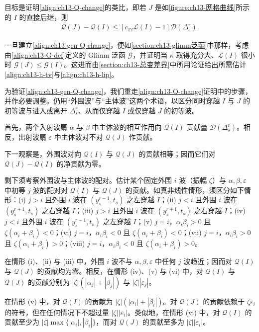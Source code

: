 \documentclass[../../main.tex]{subfiles}
\begin{document}
目标是证明\eqref{align:ch13-Q-change}的类比，即若 $J$ 是如\cref{figure:ch13-网格曲线}所示的 $I$ 的直接后继，则
\begin{align}
\mathscr{Q}(J)-\mathscr{Q}(I)\leqslant[c_{12}\mathscr{L}(I)-1]\mathscr{D}(\Delta_s^r).
\label{align:ch13-gen-Q-change}
\end{align}

一旦建立\eqref{align:ch13-gen-Q-change}，便如\cref{section:ch13-glimm泛函}中那样，考虑由\eqref{align:ch13-G-def}定义的 Glimm 泛函 $\mathscr{G}$，并证明当 $\kappa$ 取得充分大、$\mathscr{L}(I)$ 很小时 $\mathscr{G}(J)\leqslant\mathscr{G}(I)$。这进而由\cref{section:ch13-总变差界}中所用论证给出所需估计\eqref{align:ch13-h-tv}与\eqref{align:ch13-h-lip}。

为验证\eqref{align:ch13-gen-Q-change}，我们重走\eqref{align:ch13-Q-change}证明中的步骤，并作必要调整。仍用``外围波''与``主体波''这两个术语，以区分同时穿越 $I$ 与 $J$ 的初等波与进入或离开 $\Delta_s^r$、从而仅穿越 $I$ 或仅穿越 $J$ 的初等波。

首先，两个入射波扇 $\alpha$ 与 $\beta$ 中主体波的相互作用向 $\mathscr{Q}(I)$ 贡献量 $\mathscr{D}(\Delta_s^r)$。相反，出射波扇 $\varepsilon$ 中主体波对不对 $\mathscr{Q}(J)$ 作贡献。

下一观察是，外围波对向 $\mathscr{Q}(I)$ 与 $\mathscr{Q}(J)$ 的贡献相等；因而它们对 $\mathscr{Q}(J)-\mathscr{Q}(I)$ 的净贡献为零。

剩下须考察外围波与主体波的配对。估计某个固定外围 $i$ 波（振幅 $\zeta$）与 $\alpha,\beta,\varepsilon$ 中初等 $j$ 波的配对对 $\mathscr{Q}(I)$ 与 $\mathscr{Q}(J)$ 的贡献。如真非线性情形，须区分如下情形：(i) $j>i$ 且外围 $i$ 波在 $(y_s^{r-1},t_s)$ 之左穿越 $I$；(ii) $j<i$ 且外围 $i$ 波在 $(y_s^{r+1},t_s)$ 之右穿越 $I$；(iii) $j>i$ 且外围 $i$ 波在 $(y_s^{r+1},t_s)$ 之右穿越 $I$；(iv) $j<i$ 且外围 $i$ 波在 $(y_s^{r-1},t_s)$ 之左穿越 $I$；(v) $j=i$，$\alpha_i\beta_i>0$ 且 $\zeta(\alpha_i+\beta_i)<0$；(vi) $j=i$，$\alpha_i\beta_i<0$ 且 $\zeta(\alpha_i+\beta_i)<0$；(vii) $j=i$，$\alpha_i\beta_i>0$ 且 $\zeta(\alpha_i+\beta_i)>0$；(viii) $j=i$，$\alpha_i\beta_i<0$ 且 $\zeta(\alpha_i+\beta_i)>0$。

在情形 (i)、(ii) 与 (iii) 中，外围 $i$ 波不与 $\alpha,\beta,\varepsilon$ 中任何 $j$ 波趋近；因而对 $\mathscr{Q}(I)$ 与 $\mathscr{Q}(J)$ 的贡献均为零。相反，在情形 (iv)、(v) 与 (vi) 中，对 $\mathscr{Q}(I)$ 与 $\mathscr{Q}(J)$ 的贡献分别为 $|\zeta|(|\alpha_j|+|\beta_j|)$ 与 $|\zeta||\varepsilon_j|$。

在情形 (v) 中，对 $\mathscr{Q}(I)$ 的贡献为 $|\zeta|(|\alpha_i|+|\beta_i|)$。对 $\mathscr{Q}(J)$ 的贡献依赖于 $\zeta\varepsilon_i$ 的符号，但在任何情况下不超过量 $|\zeta||\varepsilon_i|$。类似地，在情形 (vi) 中，对 $\mathscr{Q}(I)$ 的贡献至少为 $|\zeta|\max\{|\alpha_i|,|\beta_i|\}$，而对 $\mathscr{Q}(J)$ 的贡献至多为 $|\zeta||\varepsilon_i|$。
\end{document}
